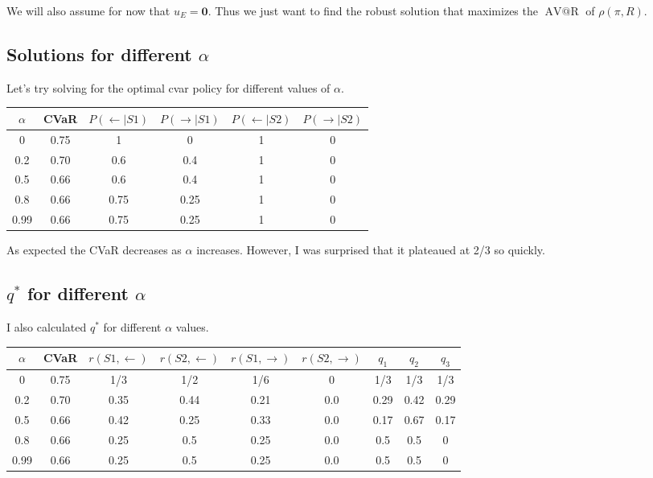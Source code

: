 \documentclass{article}
\makeatletter
\DeclareMathOperator{\avar}{AV@R}
\newcommand{\zero}{\mathbf{0}}
\makeatother
\begin{document}
We will also assume for now that $u_E = \zero$. Thus we just want to find the robust solution that maximizes the $\avar$ of $\rho(\pi, R)$.

\subsection{Solutions for different $\alpha$}
Let's try solving for the optimal cvar policy for different values of $\alpha$. 

\begin{center}
\begin{tabular}{cccccc}
\hline 
$\alpha$ & CVaR & $P(\leftarrow \mid S1)$ & $P(\rightarrow \mid S1)$ & $P(\leftarrow \mid S2)$ & $P(\rightarrow \mid S2)$ \\ 
\hline 
0 & 0.75 & 1 & 0 & 1 & 0 \\
0.2& 0.70 & 0.6 & 0.4 & 1 & 0 \\
 0.5& 0.66 & 0.6 & 0.4 & 1 & 0 \\
 0.8& 0.66 & 0.75 &  0.25 & 1 & 0 \\
  0.99& 0.66 & 0.75 & 0.25 & 1 & 0 \\
\hline 
\end{tabular} 
\end{center}

As expected the CVaR decreases as $\alpha$ increases. However, I was surprised that it plateaued at 2/3 so quickly. 

\subsection{$q^*$ for different $\alpha$}
I also calculated $q^*$ for different $\alpha$ values.


\begin{center}
\begin{tabular}{c|c|cccc|ccc}
\hline 
$\alpha$ & CVaR & $r(S1, \leftarrow)$ & $r(S2,\leftarrow)$ & $r(S1, \rightarrow)$ & $r(S2, \rightarrow)$ & $q_1$ & $q_2$ & $q_3$\\ 
\hline 
0 & 0.75 & 1/3 & 1/2 & 1/6 & 0 & 1/3 & 1/3 & 1/3 \\
0.2& 0.70 & 0.35 & 0.44 & 0.21 & 0.0 & 0.29 & 0.42 & 0.29 \\
 0.5& 0.66 & 0.42 & 0.25 & 0.33 & 0.0 & 0.17 & 0.67 & 0.17 \\
 0.8& 0.66 & 0.25 & 0.5 & 0.25 & 0.0 & 0.5 & 0.5 & 0 \\
  0.99& 0.66 & 0.25 & 0.5 & 0.25 & 0.0 & 0.5 & 0.5 & 0 \\
\hline 
\end{tabular} 
\end{center}
\end{document}

